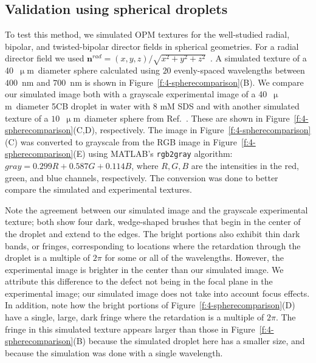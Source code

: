 \subsection{Validation using spherical droplets}
To test this method, we simulated OPM textures for the well-studied radial, bipolar, and twisted-bipolar director fields in spherical geometries.
For a radial director field we used $\mathbf{n}^{rad} = (x,y,z)/\sqrt{x^2+y^2+z^2}$~\cite{RN232}.
A simulated texture of a 40~$\upmu$m~diameter sphere calculated using $20$ evenly-spaced wavelengths between $400$~nm and $700$~nm is shown in Figure~\ref{f:4-spherecomparison}(B).
We compare our simulated image both with a grayscale experimental image of a 40~$\upmu$m~diameter 5CB droplet in water with 8 mM SDS and with another simulated texture of a $10$~$\upmu$m~diameter sphere from Ref.~\cite{RN310}.
These are shown in Figure~\ref{f:4-spherecomparison}(C,D), respectively.
The image in Figure~\ref{f:4-spherecomparison}(C) was converted to grayscale from the RGB image in Figure~\ref{f:4-spherecomparison}(E) using MATLAB's \texttt{rgb2gray} algorithm: $\mathit{gray} = 0.299 R + 0.587 G + 0.114 B$, where $R,G,B$ are the intensities in the red, green, and blue channels, respectively.
The conversion was done to better compare the simulated and experimental textures.

Note the agreement between our simulated image and the grayscale experimental texture; both show four dark, wedge-shaped brushes that begin in the center of the droplet and extend to the edges.
The bright portions also exhibit thin dark bands, or fringes, corresponding to locations where the retardation through the droplet is a multiple of $2 \pi$ for some or all of the wavelengths.
However, the experimental image is brighter in the center than our simulated image.
We attribute this difference to the defect not being in the focal plane in the experimental image; our simulated image does not take into account focus effects.
In addition, note how the bright portions of Figure~\ref{f:4-spherecomparison}(D) have a single, large, dark fringe where the retardation is a multiple of $2 \pi$.
The fringe in this simulated texture appears larger than those in Figure~\ref{f:4-spherecomparison}(B) because the simulated droplet here has a smaller size, and because the simulation was done with a single wavelength.

